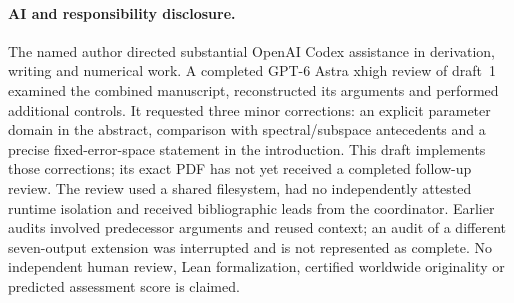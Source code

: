 \documentclass[11pt,a4paper]{article}
\begin{document}
\paragraph{AI and responsibility disclosure.}
The named author directed substantial OpenAI Codex assistance in derivation, writing and numerical work. A completed GPT-6 Astra xhigh review of draft~1 examined the combined manuscript, reconstructed its arguments and performed additional controls. It requested three minor corrections: an explicit parameter domain in the abstract, comparison with spectral/subspace antecedents and a precise fixed-error-space statement in the introduction. This draft implements those corrections; its exact PDF has not yet received a completed follow-up review. The review used a shared filesystem, had no independently attested runtime isolation and received bibliographic leads from the coordinator. Earlier audits involved predecessor arguments and reused context; an audit of a different seven-output extension was interrupted and is not represented as complete. No independent human review, Lean formalization, certified worldwide originality or predicted assessment score is claimed.
\end{document}
